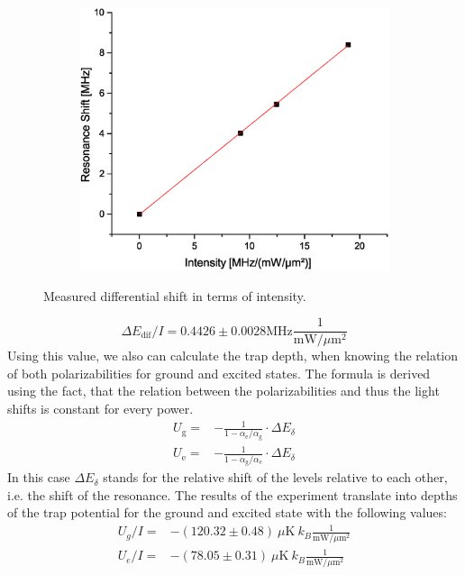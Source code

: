 \begin{figure}[h]
\centering
\begin{subfigure}[b]{0.8\textwidth}
                \includegraphics[width=\textwidth]{shiftintens}
\end{subfigure}
\caption{Measured differential shift in terms of intensity.}
\label{shiftintens}
\end{figure}
\begin{equation}
\Delta E_\mathrm{dif}/I=0.4426\pm 0.0028\mathrm{MHz}\frac{1}{\mathrm{mW}/\mu \mathrm{m}^2}
\end{equation}
Using this value, we also can calculate the trap depth, when knowing the relation of both polarizabilities for ground and excited states. The formula is derived using the fact, that the relation between the polarizabilities and thus the light shifts is constant for every power.
\begin{align}
U_{\mathrm{g}}=&-\frac{1}{1-\alpha_{\mathrm{e}}/\alpha_{\mathrm{g}}}\cdot \Delta E_\delta\\
U_{\mathrm{e}}=&-\frac{1}{1-\alpha_{\mathrm{g}}/\alpha_{\mathrm{e}}}\cdot \Delta E_\delta
\end{align}
In this case $\Delta E_\delta$ stands for the relative shift of the levels relative to each other, i.e. the shift of the resonance. The results of the experiment translate into depths of the trap potential for the ground and excited state with the following values:
\begin{align}
U_g/I=&-(120.32\pm 0.48)\ \mu\mathrm{K}\ k_B\frac{1}{\mathrm{mW}/\mu \mathrm{m}^2}\\
U_e/I=&-(78.05\pm 0.31)\ \mu\mathrm{K}\ k_B\frac{1}{\mathrm{mW}/\mu \mathrm{m}^2}
\end{align}
